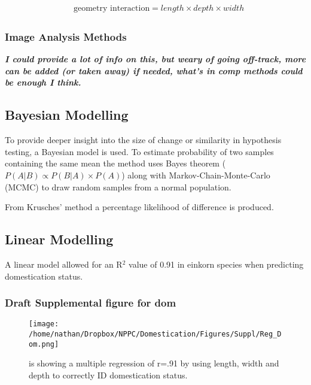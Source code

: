 \documentclass[a4paper, twocolumn]{article}
\begin{document}
 \begin{align}
\label{eq:orgf431cba}
   &\begin{aligned}
\text{geometry interaction} = length \times depth \times width
   \end{aligned}
 \end{align}

\subsubsection{Image Analysis Methods}
\label{sec:org2d9677d}
\textbf{\emph{I could provide a lot of info on this, but weary of going off-track, more can be added (or taken away) if needed, what's in comp methods could be enough I think.}}

\subsection{Bayesian Modelling}
\label{sec:org2cc43ff}
To provide deeper insight into the size of change or similarity in hypothesis testing, a Bayesian model is used. To estimate probability of two samples containing the same mean the method uses Bayes theorem (\(P(A|B) \propto P(B|A) \times P(A)\)) \cite{Kruschke2012} along with Markov-Chain-Monte-Carlo (MCMC) to draw random samples from a normal population.

From Krusches' method a percentage likelihood of difference is produced.

\subsection{Linear Modelling}
\label{sec:orga640f05}

A linear model allowed for an R\(^{\text{2}}\) value of 0.91 in einkorn species when predicting domestication status.

\subsubsection{Draft Supplemental figure for dom}
\label{sec:org8f2748d}

\begin{figure}[htbp]
\centering
\texttt{[image: /home/nathan/Dropbox/NPPC/Domestication/Figures/Suppl/Reg\_Dom.png]}
\caption{\label{fig:org99df19c}
is showing a multiple regression of r=.91 by using length, width and depth to correctly ID domestication status.}
\end{figure}
\end{document}
